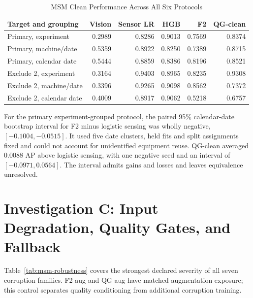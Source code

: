 \begin{table}[htbp]
\caption{MSM Clean Performance Across All Six Protocols}\label{tab:msm-sensitivity}
\centering\small
\setlength{\tabcolsep}{4pt}
\begin{tabular}{lrrrrr}\toprule
Target and grouping & Vision & Sensor LR & HGB & F2 & QG-clean\\\midrule
Primary, experiment & 0.2989 & 0.8286 & 0.9013 & 0.7569 & 0.8374\\
Primary, machine/date & 0.5359 & 0.8922 & 0.8250 & 0.7389 & 0.8715\\
Primary, calendar date & 0.5444 & 0.8859 & 0.8386 & 0.8196 & 0.8521\\
Exclude 2, experiment & 0.3164 & 0.9403 & 0.8965 & 0.8235 & 0.9308\\
Exclude 2, machine/date & 0.3396 & 0.9265 & 0.9098 & 0.8562 & 0.7372\\
Exclude 2, calendar date & 0.4009 & 0.8917 & 0.9062 & 0.5218 & 0.6757\\
\bottomrule\end{tabular}
\end{table}

For the primary experiment-grouped protocol, the paired 95\% calendar-date bootstrap
interval for F2 minus logistic sensing was wholly negative, $[-0.1004,-0.0515]$. It used five date clusters, held fits and
split assignments fixed and could not account for unidentified equipment reuse. QG-clean
averaged $0.0088$ AP above logistic sensing, with one negative seed and an interval
of $[-0.0971,0.0564]$. The interval admits gains and losses and leaves equivalence
unresolved.

\section{Investigation C: Input Degradation, Quality Gates, and Fallback}
Table~\ref{tab:msm-robustness} covers the strongest declared severity of all seven
corruption families. F2-aug and QG-aug have matched augmentation exposure; this control
separates quality conditioning from additional corruption training.

